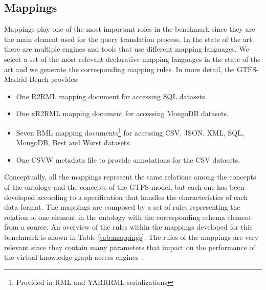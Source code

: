 \begin{table}[]
\end{table}

\subsection{Mappings} 
Mappings play one of the most important roles in the benchmark since they are the main element used for the query translation process. In the state of the art there are multiple engines and tools that use different mapping languages. We select a set of the most relevant declarative mapping languages in the state of the art and we generate the corresponding mapping rules. In more detail, the GTFS-Madrid-Bench provides:
\begin{itemize}
    \item One R2RML mapping document for accessing SQL datasets.
    \item One xR2RML mapping document for accessing MongoDB datasets.
    \item Seven RML mapping documents\footnote{Provided in RML and YARRRML serializations} for accessing CSV, JSON, XML, SQL, MongoDB, Best and Worst datasets.
    \item One CSVW metadata file to provide annotations for the CSV datasets.
\end{itemize}
Conceptually, all the mappings represent the same relations among the concepts of the ontology and the concepts of the GTFS model, but each one has been developed according to a specification that handles the characteristics of each data format. The mappings are composed by a set of rules representing the relation of one element in the ontology with the corresponding schema element from a source. An overview of the rules within the mappings developed for this benchmark is shown in Table \ref{tab:mappings}. The rules of the mappings are very relevant since they contain many parameters that impact on the performance of the virtual knowledge graph access engines~\citep{chaves2019what}. 

